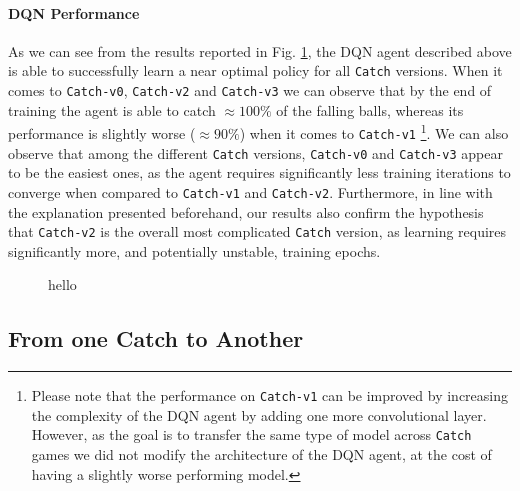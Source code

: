 \paragraph{DQN Performance}
As we can see from the results reported in Fig. \ref{fig:catch_baselines}, the DQN agent described above is able to successfully learn a near optimal policy for all \texttt{Catch} versions. When it comes to \texttt{Catch-v0}, \texttt{Catch-v2} and \texttt{Catch-v3} we can observe that by the end of training the agent is able to catch $\approx 100\%$ of the falling balls, whereas its performance is slightly worse ($\approx 90\%$) when it comes to \texttt{Catch-v1} \footnote{Please note that the performance on \texttt{Catch-v1} can be improved by increasing the complexity of the DQN agent by adding one more convolutional layer. However, as the goal is to transfer the same type of model across \texttt{Catch} games we did not modify the architecture of the DQN agent, at the cost of having a slightly worse performing model.}. We can also observe that among the different \texttt{Catch} versions, \texttt{Catch-v0} and \texttt{Catch-v3} appear to be the easiest ones, as the agent requires significantly less training iterations to converge when compared to \texttt{Catch-v1} and \texttt{Catch-v2}. Furthermore, in line with the explanation presented beforehand, our results also confirm the hypothesis that \texttt{Catch-v2} is the overall most complicated \texttt{Catch} version, as learning requires significantly more, and potentially unstable, training epochs.

\begin{figure}
\centering

\caption{hello}
\label{fig:catch_baselines}
\end{figure}

\subsection{From one Catch to Another}
\label{sec:from_one_catch_to_another}

